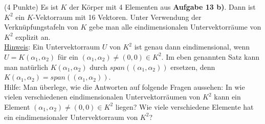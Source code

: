 \documentclass{uebblatt}
\begin{document}
\begin{aufgabe}{ (4 Punkte)}
Es ist $K$ der Körper mit 4 Elementen aus \textbf{Aufgabe 13 b)}. Dann ist $K^2$ ein $K$-Vektorraum mit 16 Vektoren. Unter Verwendung der Verknüpfungstafeln von $K$ gebe man alle eindimensionalen Untervektorräume von $K^2$ explizit an. \vspace{1.5mm} \\
\underline{Hinweis}: Ein Untervektorraum $U$ von $K^2$ ist genau dann eindimensional, wenn $U = K(\alpha_1, \alpha_2)$ für ein $(\alpha_1, \alpha_2) \neq (0, 0) \in K^2$. Im eben genannten Satz kann man natürlich $K(\alpha_1, \alpha_2)$ durch $span((\alpha_1, \alpha_2))$ ersetzen, denn $K(\alpha_1, \alpha_2) = span((\alpha_1, \alpha_2))$.\vspace{1.5mm} \\
Hilfe: Man überlege, wie die Antworten auf folgende Fragen aussehen: In wie vielen verschiedenen eindimensionalen Untervektorräumen von $K^2$ kann ein Element $(\alpha_1, \alpha_2) \neq (0, 0) \in K^2$ liegen? Wie viele verschiedene Elemente hat ein eindimensionaler Untervektorraum von $K^2$?
\end{aufgabe}
\end{document}
